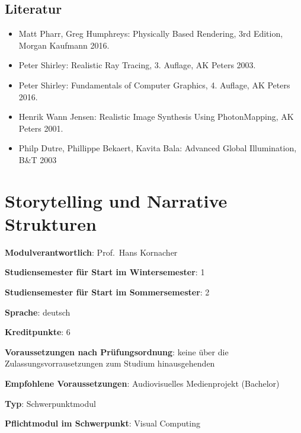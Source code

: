 \section*{Literatur\label{/mi-2017/modulbeschreibungen-master/MA_VC_Modul_PhotorealistischeBildsynthese}}\label{literaturpathlabelmi-2017modulbeschreibungen-mastermaux5fvcux5fmodulux5fphotorealistischebildsynthese}

\begin{itemize}
\tightlist
\item
  Matt Pharr, Greg Humphreys: Physically Based Rendering, 3rd Edition,
  Morgan Kaufmann 2016.
\item
  Peter Shirley: Realistic Ray Tracing, 3. Auflage, AK Peters 2003.
\item
  Peter Shirley: Fundamentals of Computer Graphics, 4. Auflage, AK
  Peters 2016.
\item
  Henrik Wann Jensen: Realistic Image Synthesis Using PhotonMapping, AK
  Peters 2001.
\item
  Philp Dutre, Phillippe Bekaert, Kavita Bala: Advanced Global
  Illumination, B\&T 2003
\end{itemize}

\chapter{Storytelling und Narrative
Strukturen\label{/mi-2017/modulbeschreibungen-master/MA_VC_Modul_Storytelling}}\label{storytelling-und-narrative-strukturenpathlabelmi-2017modulbeschreibungen-mastermaux5fvcux5fmodulux5fstorytelling}

\begin{modulHead}
\textbf{Modulverantwortlich}: Prof.~Hans
Kornacher
\end{modulHead}
\begin{modulHead}
\textbf{Studiensemester für
Start im Wintersemester}:
1
\end{modulHead}
\begin{modulHead}
\textbf{Studiensemester für Start
im Sommersemester}:
2
\end{modulHead}
\begin{modulHead}
\textbf{Sprache}:
deutsch
\end{modulHead}
\begin{modulHead}
\textbf{Kreditpunkte}:
6
\end{modulHead}
\begin{modulHead}
\textbf{Voraussetzungen nach
Prüfungsordnung}: keine über die Zulassungsvorrausetzungen zum Studium
hinausgehenden
\end{modulHead}
\begin{modulHead}
\textbf{Empfohlene
Voraussetzungen}: Audiovisuelles Medienprojekt
(Bachelor)
\end{modulHead}
\begin{modulHead}
\textbf{Typ}:
Schwerpunktmodul
\end{modulHead}
\begin{modulHead}
\textbf{Pflichtmodul
im Schwerpunkt}: Visual Computing
\end{modulHead}



